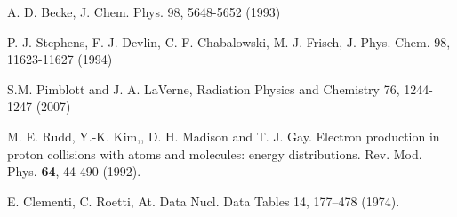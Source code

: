 \documentclass[preprint,12pt]{article}
\begin{document}
\begin{thebibliography}{99}
A. D. Becke, 
J. Chem. Phys. 98, 5648-5652 (1993) 

P. J. Stephens, F. J. Devlin, C. F. Chabalowski, M. J. Frisch,
J. Phys. Chem. 98, 11623-11627 (1994) 

S.M. Pimblott and J. A. LaVerne, Radiation
Physics and Chemistry 76, 1244-1247 (2007)

M. E. Rudd, Y.-K. Kim,, D. H. Madison and T. J. Gay.
Electron production in proton collisions with atoms and molecules: energy
distributions. 
Rev. Mod. Phys. \textbf{64}, 44-490 (1992).

E. Clementi, C. Roetti,
At. Data Nucl. Data Tables 14, 177--478 (1974).


\end{thebibliography}
\end{document}

